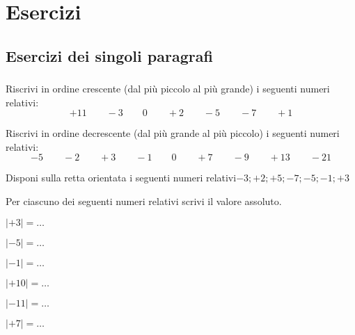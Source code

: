 
\section{Esercizi}

\subsection{Esercizi dei singoli paragrafi}

\subsubsection*{}


\begin{esercizio}
 \label{ese:2.1}
Riscrivi in ordine crescente (dal più piccolo al più grande) i seguenti numeri 
relativi:
\[+11\qquad-3\qquad0\qquad+2\qquad-5\qquad-7\qquad+1\]
\end{esercizio}

\begin{esercizio}
 \label{ese:2.2}
Riscrivi in ordine decrescente (dal più grande al più piccolo) i seguenti numeri 
relativi:
\[-5\qquad-2\qquad+3\qquad-1\qquad0\qquad+7\qquad-9\qquad+13\qquad-21\]
\end{esercizio}

\begin{esercizio}
 \label{ese:2.3}
Disponi sulla retta orientata i seguenti numeri relativi\(-3; +2; +5; -7; -5; -1; 
+3\)
\begin{center}
 
\end{center}

\end{esercizio}

\begin{esercizio}
 \label{ese:2.4}
Per ciascuno dei seguenti numeri relativi scrivi il valore assoluto.
\begin{multicols}{3}
\begin{enumeratea}
 \item \(|+3|=\ldots\)
 \item \(|-5|=\ldots\)
 \item \(|-1|=\ldots\)
 \item \(|+10|=\ldots\)
 \item \(|-11|=\ldots\)
 \item \(|+7|=\ldots\)
\end{enumeratea}
\end{multicols}
\end{esercizio}

